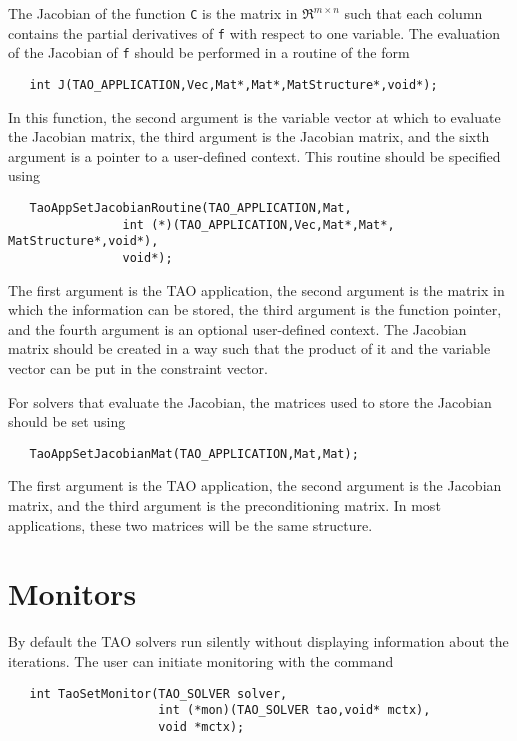 The Jacobian of the function {\tt C} is the matrix in $\Re^{m \times n}$
such that each column contains the partial derivatives of {\tt f} with respect
to one variable. 
The evaluation of the Jacobian of {\tt f} should be performed in a routine
of the form
\begin{verbatim}
   int J(TAO_APPLICATION,Vec,Mat*,Mat*,MatStructure*,void*);
\end{verbatim}
\noindent
In this function, the second argument is the variable vector at which to 
evaluate the Jacobian matrix, the third argument is the Jacobian matrix,
and the sixth argument is a pointer to a user-defined context.
This routine should be specified using
\begin{verbatim}
   TaoAppSetJacobianRoutine(TAO_APPLICATION,Mat,
                int (*)(TAO_APPLICATION,Vec,Mat*,Mat*, MatStructure*,void*), 
                void*);
\end{verbatim}
\noindent
The first argument is the TAO application, the second
argument is the matrix in which the information can be stored,
the third argument is the function pointer, and the fourth argument is
an optional user-defined context.
The Jacobian matrix should be created in a way such that the product of 
it and the variable vector can be put in the constraint vector.

For solvers that evaluate the Jacobian, 
the matrices used to store the Jacobian should be set using 
\begin{verbatim}
   TaoAppSetJacobianMat(TAO_APPLICATION,Mat,Mat);
\end{verbatim}
\noindent
The first argument is the TAO application, the second argument is the Jacobian
matrix, and the third argument is the preconditioning matrix.  In most applications,
these two matrices will be the same structure.

\section{Monitors}

By default the TAO solvers run silently without displaying information
about the iterations. The user can initiate monitoring with the
command  
\begin{verbatim}
   int TaoSetMonitor(TAO_SOLVER solver,
                     int (*mon)(TAO_SOLVER tao,void* mctx),
                     void *mctx);
\end{verbatim}
\noindent

